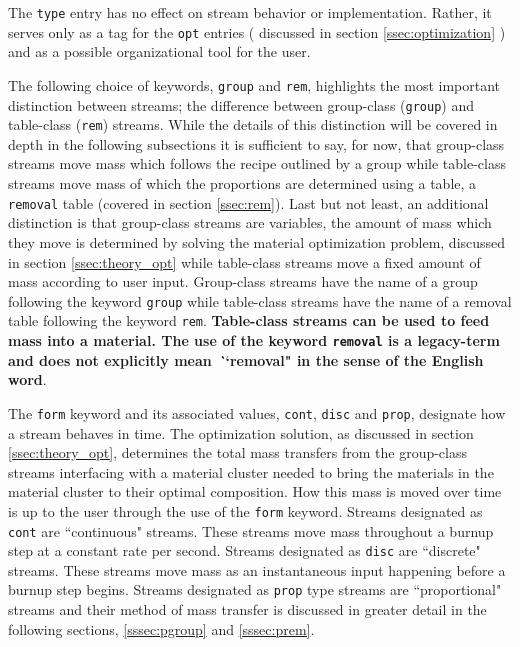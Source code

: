 The \texttt{type} entry has no effect on stream behavior or implementation.
Rather, it serves only as a tag for the \texttt{opt} entries ( discussed
in section \ref{ssec:optimization} ) and as a possible organizational tool
for the user.

The following choice of keywords, \texttt{group} and \texttt{rem}, highlights
the most important distinction between streams; the difference between
group-class (\texttt{group}) and table-class (\texttt{rem}) streams.
While the details of this distinction will be covered in depth in the following
subsections it is sufficient to say, for now, that group-class streams move mass
which follows the recipe outlined by a group while table-class streams move
mass of which the proportions are determined using a table, a \texttt{removal}
table (covered in section \ref{ssec:rem}). Last but not least, an
additional distinction is that group-class streams are variables, the amount of
mass which they move is determined by solving the material optimization problem,
discussed in section \ref{ssec:theory_opt} while table-class streams move a
fixed amount of mass according to user input. Group-class streams have the name
of a group following the keyword \texttt{group} while table-class streams have
the name of a removal table following the keyword \texttt{rem}.
\textbf{Table-class streams can be used to feed mass into a material. The use
of the keyword \texttt{removal} is a legacy-term and does not explicitly mean 
\textit``{removal}" in the sense of the English word}.

The \texttt{form} keyword and its associated values, \texttt{cont},
\texttt{disc} and \texttt{prop}, designate how a stream behaves in time. The
optimization solution, as discussed in section \ref{ssec:theory_opt}, determines
the total mass transfers from the group-class streams interfacing with a material
cluster needed to bring the materials in the material cluster to their optimal
composition. How this mass is moved over time is up to the user through the use
of the \texttt{form} keyword. Streams designated as \texttt{cont} are
``continuous" streams. These streams move mass throughout a burnup step at a
constant rate per second. Streams designated as \texttt{disc} are ``discrete"
streams. These streams move mass as an instantaneous input happening before a
burnup step begins. Streams designated as \texttt{prop} type streams are
``proportional" streams and their method of mass transfer is discussed in
greater detail in the following sections, \ref{sssec:pgroup} and 
\ref{sssec:prem}.

